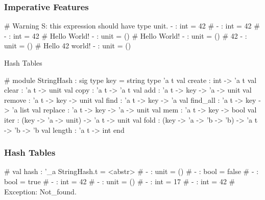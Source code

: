\documentclass{plt}
\begin{document}
\fi


\begin{frame}[fragile]
  \frametitle{Imperative Features}

\begin{interactive}
# 
Warning S: this expression should have type unit.
- : int = 42
# 
- : int = 42
# 
- : int = 42
# 
Hello World!
- : unit = ()
# 
Hello World!
- : unit = ()
# 
42
- : unit = ()
# 
Hello 42 world!
- : unit = ()
\end{interactive}

\end{frame}

\begin{frame}[fragile]{Hash Tables}

\begin{interactive}
# 
module StringHash :
  sig
    type key = string
    type 'a t
    val create : int -> 'a t
    val clear : 'a t -> unit
    val copy : 'a t -> 'a t
    val add : 'a t -> key -> 'a -> unit
    val remove : 'a t -> key -> unit
    val find : 'a t -> key -> 'a
    val find_all : 'a t -> key -> 'a list
    val replace : 'a t -> key -> 'a -> unit
    val mem : 'a t -> key -> bool
    val iter : (key -> 'a -> unit) -> 'a t -> unit
    val fold : (key -> 'a -> 'b -> 'b) -> 'a t -> 'b -> 'b
    val length : 'a t -> int
  end
\end{interactive}

\end{frame}

\begin{frame}[fragile]
  \frametitle{Hash Tables}

\begin{interactive}
# 
val hash : '_a StringHash.t = <abstr>
# 
- : unit = ()
# 
- : bool = false
# 
- : bool = true
# 
- : int = 42
# 
- : unit = ()
# 
- : int = 17
# 
- : int = 42
# 
Exception: Not_found.
\end{interactive}

\end{frame}
\end{document}

